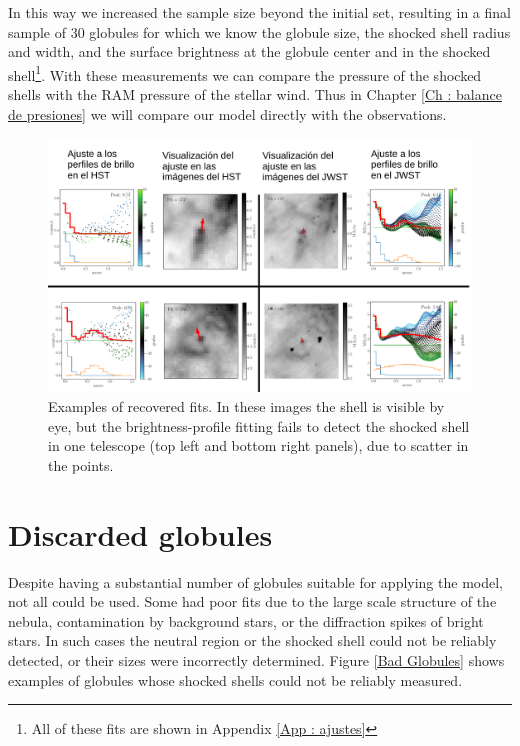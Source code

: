 \documentclass{book}
\begin{document}
In this way we increased the sample size beyond the initial set,
resulting in a final sample of 30 globules for which we know the
globule size, the shocked shell radius and width, and the surface
brightness at the globule center and in the shocked shell\footnote{All
  of these fits are shown in Appendix \ref{App : ajustes}}. With these
measurements we can compare the pressure of the shocked shells with
the RAM pressure of the stellar wind. Thus in Chapter \ref{Ch :
  balance de presiones} we will compare our model directly with the
observations.

\begin{figure}[htb]
    \centering
    \includegraphics[width=\textwidth]{imagenes_corregidas/recuperados_aj.pdf}
    \caption{Examples of recovered fits. In these images the shell is
      visible by eye, but the brightness-profile fitting fails to
      detect the shocked shell in one telescope (top left and bottom
      right panels), due to scatter in the points.}
    \label{Recuperados Globulos}
\end{figure}

\section{Discarded globules}\label{Bad globules}

Despite having a substantial number of globules suitable for applying
the model, not all could be used. Some had poor fits due to the large
scale structure of the nebula, contamination by background stars, or
the diffraction spikes of bright stars. In such cases the neutral
region or the shocked shell could not be reliably detected, or their
sizes were incorrectly determined. Figure \ref{Bad Globules} shows
examples of globules whose shocked shells could not be reliably
measured.
\end{document}
